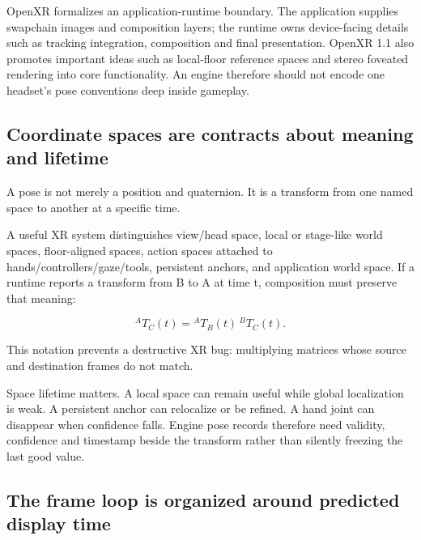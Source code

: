 OpenXR formalizes an application-runtime boundary. The application supplies swapchain images and composition layers; the runtime owns device-facing details such as tracking integration, composition and final presentation. OpenXR 1.1 also promotes important ideas such as local-floor reference spaces and stereo foveated rendering into core functionality. An engine therefore should not encode one headset's pose conventions deep inside gameplay.

\subsection{Coordinate spaces are contracts about meaning and lifetime}\label{04-visual-computing-ii-ch035-coordinate-spaces-are-contracts-about-meaning-and-lifetime}

\hypertarget{04-visual-computing-ii-ch035-coordinate-spaces-are-contracts-about-meaning-and-lifetime}{}

A pose is not merely a position and quaternion. It is a transform from one named space to another at a specific time.

A useful XR system distinguishes view/head space, local or stage-like world spaces, floor-aligned spaces, action spaces attached to hands/controllers/gaze/tools, persistent anchors, and application world space. If a runtime reports a transform from B to A at time t, composition must preserve that meaning:

\[
{}^AT_C(t) = {}^AT_B(t)\,{}^BT_C(t).
\]

This notation prevents a destructive XR bug: multiplying matrices whose source and destination frames do not match.

Space lifetime matters. A local space can remain useful while global localization is weak. A persistent anchor can relocalize or be refined. A hand joint can disappear when confidence falls. Engine pose records therefore need validity, confidence and timestamp beside the transform rather than silently freezing the last good value.

\subsection{The frame loop is organized around predicted display time}\label{04-visual-computing-ii-ch035-the-frame-loop-is-organized-around-predicted-display-time}

\hypertarget{04-visual-computing-ii-ch035-the-frame-loop-is-organized-around-predicted-display-time}{}

